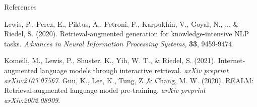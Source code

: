 \begin{frame}{References}
    \begin{thebibliography}{9}
        Lewis, P., Perez, E., Piktus, A., Petroni, F., Karpukhin, V., Goyal, N., ... \& Riedel, S. (2020). Retrieval-augmented generation for knowledge-intensive NLP tasks. \textit{Advances in Neural Information Processing Systems}, \textbf{33}, 9459-9474.

                Komeili, M., Lewis, P., Shuster, K., Yih, W. T., \& Riedel, S. (2021). Internet-augmented language models through interactive retrieval. \textit{arXiv preprint arXiv:2103.07567}.
                Guu, K., Lee, K., Tung, Z.,\& Chang, M. W. (2020). REALM: Retrieval-augmented language model pre-training. \textit{arXiv preprint arXiv:2002.08909}.

    \end{thebibliography}
\end{frame}



